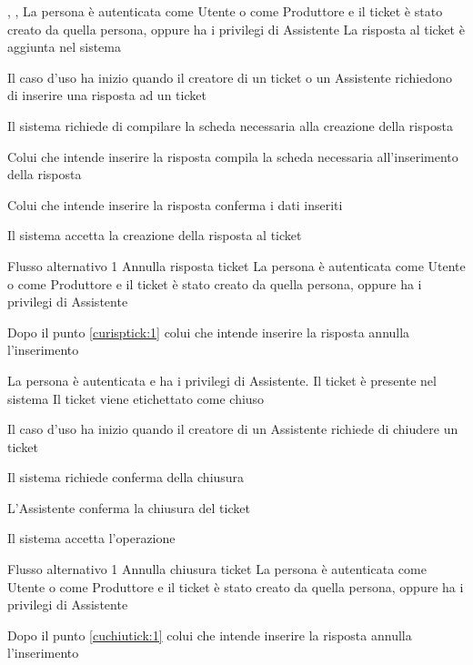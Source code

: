 \tabcuvspace

{, , }
{La persona è autenticata come Utente o come Produttore e il ticket è stato creato da quella persona, oppure ha i privilegi di Assistente}
{La risposta al ticket è aggiunta nel sistema}
{\begin{enumCU}
	\item Il caso d'uso ha inizio quando il creatore di un ticket o un Assistente richiedono di inserire una risposta ad un ticket
	\item Il sistema richiede di compilare la scheda necessaria alla creazione della risposta
	\item Colui che intende inserire la risposta compila la scheda necessaria all'inserimento della risposta\label{curisptick:1}
	\item Colui che intende inserire la risposta conferma i dati inseriti
	\item Il sistema accetta la creazione della risposta al ticket
\end{enumCU}}
%
{Flusso alternativo 1}%
{Annulla risposta ticket}%
{La persona è autenticata come Utente o come Produttore e il ticket è stato creato da quella persona, oppure ha i privilegi di Assistente}%
{\postNulle}%
{\begin{enumCU}
		\item Dopo il punto \ref{curisptick:1} colui che intende inserire la risposta annulla l'inserimento
	\end{enumCU}}%

\tabcuvspace

{}
{La persona è autenticata e ha i privilegi di Assistente. Il ticket è presente nel sistema}
{Il ticket viene etichettato come chiuso}
{\begin{enumCU}
	\item Il caso d'uso ha inizio quando il creatore di un Assistente richiede di chiudere un ticket
	\item Il sistema richiede conferma della chiusura \label{cuchiutick:1}
	\item L'Assistente conferma la chiusura del ticket
	\item Il sistema accetta l'operazione
\end{enumCU}}
%
{Flusso alternativo 1}%
{Annulla chiusura ticket}%
{La persona è autenticata come Utente o come Produttore e il ticket è stato creato da quella persona, oppure ha i privilegi di Assistente}%
{\postNulle}%
{\begin{enumCU}
		\item Dopo il punto \ref{cuchiutick:1} colui che intende inserire la risposta annulla l'inserimento
	\end{enumCU}}%

